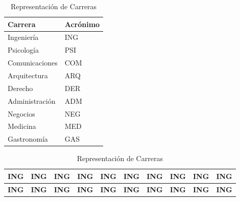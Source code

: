 \documentclass{article}
\begin{document}
\begin{table}[H]
  \centering
  \hspace*{-2cm} %
  \begin{minipage}{0.35\textwidth} %
    \centering
    \begin{tabular}{l @{\hskip 0.5cm} l}
      \hline
      \textbf{Carrera} & \textbf{Acrónimo} \\ \hline
      Ingeniería       & \small{ING}                \\ \hline
      Psicología       & \small{PSI}                \\ \hline
      Comunicaciones   & \small{COM}                \\ \hline
      Arquitectura     & \small{ARQ}                \\ \hline
      Derecho          & \small{DER}                \\ \hline
      Administración   & \small{ADM}                \\ \hline
      Negocios         & \small{NEG}                \\ \hline
      Medicina         & \small{MED}                \\ \hline
      Gastronomía      & \small{GAS}               \\ \hline
    \end{tabular}
    \caption{Carreras y acrónimos de los estudiantes en la muestra.}
    \label{tab:carreras-acronimos}
  \end{minipage}
  \hspace{0.2cm} %
  \begin{minipage}{0.45\textwidth} %
    \centering
    \caption{Representación de Carreras}
    \begin{tabular}{|>{\footnotesize}m{0.7cm}|>{\footnotesize}m{0.7cm}|>{\footnotesize}m{0.7cm}|>{\footnotesize}m{0.7cm}|>{\footnotesize}m{0.7cm}|>{\footnotesize}m{0.7cm}|>{\footnotesize}m{0.7cm}|>{\footnotesize}m{0.7cm}|>{\footnotesize}m{0.7cm}|>{\footnotesize}m{0.7cm}|}
      \hline
      \footnotesize{\textbf{ING}} & \footnotesize{\textbf{ING}} & \footnotesize{\textbf{ING}} & \footnotesize{\textbf{ING}} & \footnotesize{\textbf{ING}} & \footnotesize{\textbf{ING}} & \footnotesize{\textbf{ING}} & \footnotesize{\textbf{ING}} & \footnotesize{\textbf{ING}} & \footnotesize{\textbf{ING}} \\ \hline
      \footnotesize{\textbf{ING}} & \footnotesize{\textbf{ING}} & \footnotesize{\textbf{ING}} & \footnotesize{\textbf{ING}} & \footnotesize{\textbf{ING}} & \footnotesize{\textbf{ING}} & \footnotesize{\textbf{ING}} & \footnotesize{\textbf{ING}} & \footnotesize{\textbf{ING}} & \footnotesize{\textbf{ING}} \\ \hline

\end{tabular}
\end{minipage}
\end{table}
\end{document}
